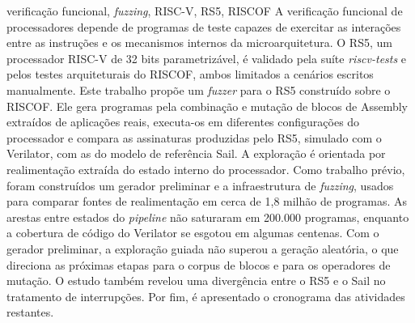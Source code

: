 \documentclass[portuguese,oneside]{tcc}
\begin{document}
\begin{resumo}{verificação funcional, \textit{fuzzing}, RISC-V, RS5, RISCOF}
A verificação funcional de processadores depende de programas de teste capazes de exercitar as interações entre as instruções e os mecanismos internos da microarquitetura. O RS5, um processador RISC-V de 32 bits parametrizável, é validado pela suíte \textit{riscv-tests} e pelos testes arquiteturais do RISCOF, ambos limitados a cenários escritos manualmente. Este trabalho propõe um \textit{fuzzer} para o RS5 construído sobre o RISCOF. Ele gera programas pela combinação e mutação de blocos de Assembly extraídos de aplicações reais, executa-os em diferentes configurações do processador e compara as assinaturas produzidas pelo RS5, simulado com o Verilator, com as do modelo de referência Sail. A exploração é orientada por realimentação extraída do estado interno do processador. Como trabalho prévio, foram construídos um gerador preliminar e a infraestrutura de \textit{fuzzing}, usados para comparar fontes de realimentação em cerca de 1,8 milhão de programas. As arestas entre estados do \textit{pipeline} não saturaram em 200.000 programas, enquanto a cobertura de código do Verilator se esgotou em algumas centenas. Com o gerador preliminar, a exploração guiada não superou a geração aleatória, o que direciona as próximas etapas para o corpus de blocos e para os operadores de mutação. O estudo também revelou uma divergência entre o RS5 e o Sail no tratamento de interrupções. Por fim, é apresentado o cronograma das atividades restantes.
\end{resumo}
\end{document}

